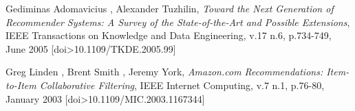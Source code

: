 \documentclass[11pt,letterpaper]{article}
\begin{document}
\newpage
\newpage
\begin{thebibliography}{13}
   Gediminas Adomavicius , Alexander Tuzhilin, \textit{Toward the Next Generation of Recommender Systems: A Survey of the State-of-the-Art and Possible Extensions}, IEEE Transactions on Knowledge and Data Engineering, v.17 n.6, p.734-749, June 2005  [doi>10.1109/TKDE.2005.99]




   Greg Linden , Brent Smith , Jeremy York, \textit{Amazon.com Recommendations: Item-to-Item Collaborative Filtering}, IEEE Internet Computing, v.7 n.1, p.76-80, January 2003  [doi>10.1109/MIC.2003.1167344]





\end{thebibliography}
\end{document}
